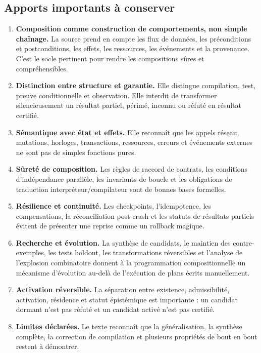 \documentclass[11pt,a4paper]{article}
\begin{document}
\subsection{Apports importants à conserver}
\begin{enumerate}
\item \textbf{Composition comme construction de comportements, non simple chaînage.} La source prend en compte les flux de données, les préconditions et postconditions, les effets, les ressources, les événements et la provenance. C'est le socle pertinent pour rendre les compositions sûres et compréhensibles.
\item \textbf{Distinction entre structure et garantie.} Elle distingue compilation, test, preuve conditionnelle et observation. Elle interdit de transformer silencieusement un résultat partiel, périmé, inconnu ou réfuté en résultat certifié.
\item \textbf{Sémantique avec état et effets.} Elle reconnaît que les appels réseau, mutations, horloges, transactions, ressources, erreurs et événements externes ne sont pas de simples fonctions pures.
\item \textbf{Sûreté de composition.} Les règles de raccord de contrats, les conditions d'indépendance parallèle, les invariants de boucle et les obligations de traduction interpréteur/compilateur sont de bonnes bases formelles.
\item \textbf{Résilience et continuité.} Les checkpoints, l'idempotence, les compensations, la réconciliation post-crash et les statuts de résultats partiels évitent de présenter une reprise comme un rollback magique.
\item \textbf{Recherche et évolution.} La synthèse de candidats, le maintien des contre-exemples, les tests holdout, les transformations réversibles et l'analyse de l'explosion combinatoire donnent à la programmation compositionnelle un mécanisme d'évolution au-delà de l'exécution de plans écrits manuellement.
\item \textbf{Activation réversible.} La séparation entre existence, admissibilité, activation, résidence et statut épistémique est importante : un candidat dormant n'est pas réfuté et un candidat activé n'est pas certifié.
\item \textbf{Limites déclarées.} Le texte reconnaît que la généralisation, la synthèse complète, la correction de compilation et plusieurs propriétés de bout en bout restent à démontrer.
\end{enumerate}
\end{document}
